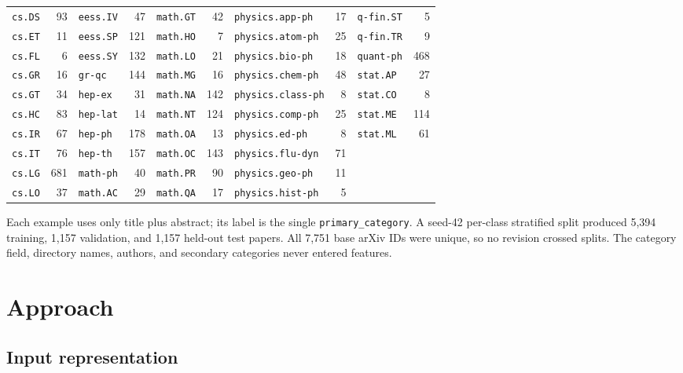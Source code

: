 \documentclass[10pt]{article}
\begin{document}
\begin{table}[H]
\begin{tabular}{lr lr lr lr lr}
    \texttt{cs.DS} & 93 & \texttt{eess.IV} & 47 & \texttt{math.GT} & 42 & \texttt{physics.app-ph} & 17 & \texttt{q-fin.ST} & 5 \\
    \texttt{cs.ET} & 11 & \texttt{eess.SP} & 121 & \texttt{math.HO} & 7 & \texttt{physics.atom-ph} & 25 & \texttt{q-fin.TR} & 9 \\
    \texttt{cs.FL} & 6 & \texttt{eess.SY} & 132 & \texttt{math.LO} & 21 & \texttt{physics.bio-ph} & 18 & \texttt{quant-ph} & 468 \\
    \texttt{cs.GR} & 16 & \texttt{gr-qc} & 144 & \texttt{math.MG} & 16 & \texttt{physics.chem-ph} & 48 & \texttt{stat.AP} & 27 \\
    \texttt{cs.GT} & 34 & \texttt{hep-ex} & 31 & \texttt{math.NA} & 142 & \texttt{physics.class-ph} & 8 & \texttt{stat.CO} & 8 \\
    \texttt{cs.HC} & 83 & \texttt{hep-lat} & 14 & \texttt{math.NT} & 124 & \texttt{physics.comp-ph} & 25 & \texttt{stat.ME} & 114 \\
    \texttt{cs.IR} & 67 & \texttt{hep-ph} & 178 & \texttt{math.OA} & 13 & \texttt{physics.ed-ph} & 8 & \texttt{stat.ML} & 61 \\
    \texttt{cs.IT} & 76 & \texttt{hep-th} & 157 & \texttt{math.OC} & 143 & \texttt{physics.flu-dyn} & 71 & & \\
    \texttt{cs.LG} & 681 & \texttt{math-ph} & 40 & \texttt{math.PR} & 90 & \texttt{physics.geo-ph} & 11 & & \\
    \texttt{cs.LO} & 37 & \texttt{math.AC} & 29 & \texttt{math.QA} & 17 & \texttt{physics.hist-ph} & 5 & & \\
    \bottomrule
  \end{tabular}
\end{table}

\vspace{-2pt}
Each example uses only title plus abstract; its label is the single
\texttt{primary\_category}. A seed-42 per-class stratified split produced
5,394 training, 1,157 validation, and 1,157 held-out test papers. All 7,751
base arXiv IDs were unique, so no revision crossed splits. The category field,
directory names, authors, and secondary categories never entered features.

\clearpage

\section{Approach}
\subsection{Input representation}
\end{document}
